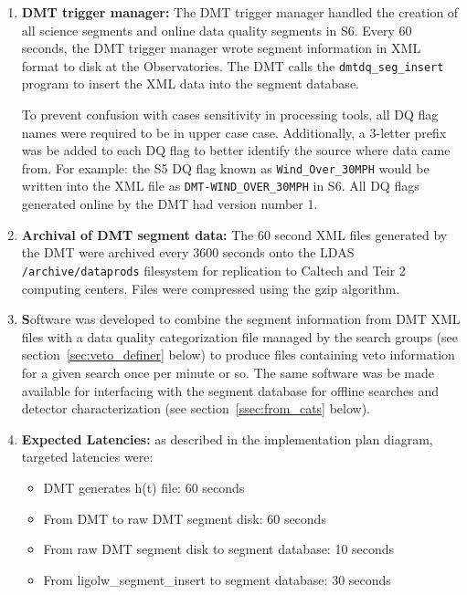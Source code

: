 \begin{enumerate}
\item \textbf{DMT trigger manager:} The DMT trigger manager handled
the creation of all science segments and online data quality segments
in S6. Every 60 seconds, the DMT trigger manager wrote segment
information in XML format to disk at the Observatories. The DMT calls
the \texttt{dmtdq\_seg\_insert} program to insert the XML data into
the segment database.

To prevent confusion with cases sensitivity in processing tools, all
DQ flag names were required to be in upper case case. Additionally, a
3-letter prefix was be added to each DQ flag to better identify the
source where data came from. For example: the S5 DQ flag known as
\texttt{Wind\_Over\_30MPH} would be written into the XML file as
\texttt{DMT-WIND\_OVER\_30MPH} in S6. All DQ flags generated online by
the DMT had version number 1.

\item \textbf{Archival of DMT segment data:} The 60 second XML files
generated by the DMT were archived every 3600 seconds onto the LDAS
\verb|/archive/dataprods| filesystem for replication to Caltech and
Teir 2 computing centers. Files were compressed using the gzip
algorithm.

\item \textbf Software was developed to combine the segment
information from DMT XML files with a data quality categorization file
managed by the search groups (see section~\ref{sec:veto_definer}
below) to produce files containing veto information for a given search
once per minute or so.  The same software was be made available for
interfacing with the segment database for offline searches and
detector characterization (see section~\ref{ssec:from_cats}
below).

\item \textbf{Expected Latencies:} as described in the implementation plan
diagram, targeted latencies were:
\begin{itemize}
\item DMT generates h(t) file: 60 seconds
\item From DMT to raw DMT segment disk: 60 seconds
\item From raw DMT segment disk to segment database: 10 seconds
\item From ligolw\_segment\_insert to segment database: 30 seconds
\end{itemize}
\end{enumerate}



